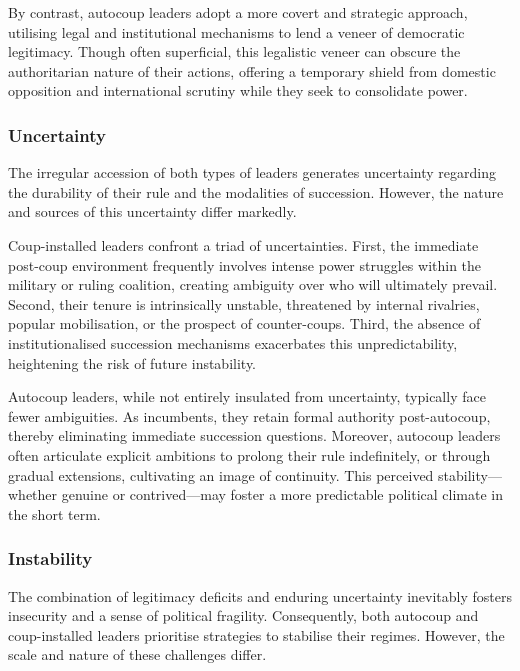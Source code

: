 \documentclass[
  12pt,
]{report}
\begin{document}
By contrast, autocoup leaders adopt a more covert and strategic
approach, utilising legal and institutional mechanisms to lend a veneer
of democratic legitimacy. Though often superficial, this legalistic
veneer can obscure the authoritarian nature of their actions, offering a
temporary shield from domestic opposition and international scrutiny
while they seek to consolidate power.

\subsubsection*{Uncertainty}\label{uncertainty}

The irregular accession of both types of leaders generates uncertainty
regarding the durability of their rule and the modalities of succession.
However, the nature and sources of this uncertainty differ markedly.

Coup-installed leaders confront a triad of uncertainties. First, the
immediate post-coup environment frequently involves intense power
struggles within the military or ruling coalition, creating ambiguity
over who will ultimately prevail. Second, their tenure is intrinsically
unstable, threatened by internal rivalries, popular mobilisation, or the
prospect of counter-coups. Third, the absence of institutionalised
succession mechanisms exacerbates this unpredictability, heightening the
risk of future instability.

Autocoup leaders, while not entirely insulated from uncertainty,
typically face fewer ambiguities. As incumbents, they retain formal
authority post-autocoup, thereby eliminating immediate succession
questions. Moreover, autocoup leaders often articulate explicit
ambitions to prolong their rule indefinitely, or through gradual
extensions, cultivating an image of continuity. This perceived
stability---whether genuine or contrived---may foster a more predictable
political climate in the short term.

\subsubsection*{Instability}\label{instability}

The combination of legitimacy deficits and enduring uncertainty
inevitably fosters insecurity and a sense of political fragility.
Consequently, both autocoup and coup-installed leaders prioritise
strategies to stabilise their regimes. However, the scale and nature of
these challenges differ.
\end{document}
